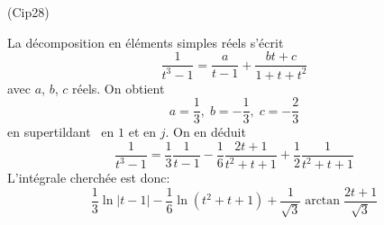 \begin{tiny}(Cip28)\end{tiny} La décomposition en éléments simples réels s'écrit
\begin{displaymath}
  \frac{1}{t^3-1} = \frac{a}{t-1} + \frac{bt + c}{1+t+t^2}
\end{displaymath}
avec $a$, $b$, $c$ réels. On obtient
\begin{displaymath}
  a=\frac{1}{3},\; b=-\frac{1}{3},\; c=-\frac{2}{3}
\end{displaymath}
en \og supertildant\fg~ en $1$ et en $j$. On en déduit
\begin{displaymath}
  \frac{1}{t^3-1} = \frac{1}{3}\frac{1}{t-1} 
  -\frac{1}{6}\frac{2t+1}{t^2+t+1} 
  +\frac{1}{2}\frac{1}{t^2+t+1}
\end{displaymath}
L'intégrale cherchée est donc:
\begin{displaymath}
  \frac{1}{3}\ln \left|t-1\right|
  -\frac{1}{6}\ln(t^2+t+1)
  +\frac{1}{\sqrt{3}}\arctan\frac{2t+1}{\sqrt{3}}
\end{displaymath}
